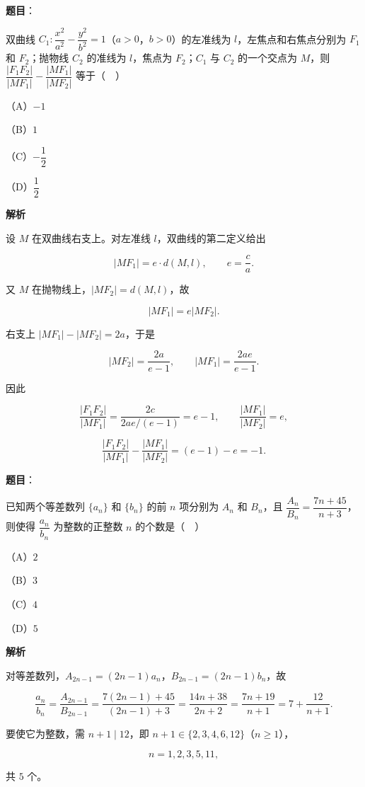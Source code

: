 \begin{answer}

\textbf{题目}：

双曲线 $C_1:\dfrac{x^2}{a^2}-\dfrac{y^2}{b^2}=1$（$a>0$，$b>0$）的左准线为 $l$，左焦点和右焦点分别为 $F_1$ 和 $F_2$；抛物线 $C_2$ 的准线为 $l$，焦点为 $F_2$；$C_1$ 与 $C_2$ 的一个交点为 $M$，则 $\dfrac{|F_1F_2|}{|MF_1|}-\dfrac{|MF_1|}{|MF_2|}$ 等于（　）

（A）$-1$

（B）$1$

（C）$-\dfrac12$

（D）$\dfrac12$

\textbf{解析}

设 $M$ 在双曲线右支上。对左准线 $l$，双曲线的第二定义给出

\nopagebreak[4]
\[|MF_1|=e\cdot d(M,l),\qquad e=\frac ca.\]

又 $M$ 在抛物线上，$|MF_2|=d(M,l)$，故

\nopagebreak[4]
\[|MF_1|=e|MF_2|.\]

右支上 $|MF_1|-|MF_2|=2a$，于是

\nopagebreak[4]
\[|MF_2|=\frac{2a}{e-1},\qquad |MF_1|=\frac{2ae}{e-1}.\]

因此

\nopagebreak[4]
\[\frac{|F_1F_2|}{|MF_1|}=\frac{2c}{2ae/(e-1)}=e-1,\qquad \frac{|MF_1|}{|MF_2|}=e,\]

\nopagebreak[4]
\[\frac{|F_1F_2|}{|MF_1|}-\frac{|MF_1|}{|MF_2|}=(e-1)-e=-1.\]


\end{answer}
\begin{answer}

\textbf{题目}：

已知两个等差数列 $\{a_n\}$ 和 $\{b_n\}$ 的前 $n$ 项分别为 $A_n$ 和 $B_n$，且 $\dfrac{A_n}{B_n}=\dfrac{7n+45}{n+3}$，则使得 $\dfrac{a_n}{b_n}$ 为整数的正整数 $n$ 的个数是（　）

（A）$2$

（B）$3$

（C）$4$

（D）$5$

\textbf{解析}

对等差数列，$A_{2n-1}=(2n-1)a_n$，$B_{2n-1}=(2n-1)b_n$，故

\nopagebreak[4]
\[\frac{a_n}{b_n}=\frac{A_{2n-1}}{B_{2n-1}}
=\frac{7(2n-1)+45}{(2n-1)+3}=\frac{14n+38}{2n+2}=\frac{7n+19}{n+1}=7+\frac{12}{n+1}.\]

要使它为整数，需 $n+1\mid12$，即 $n+1\in\{2,3,4,6,12\}$（$n\geqslant1$），

\nopagebreak[4]
\[n=1,2,3,5,11,\]

共 $5$ 个。


\end{answer}
